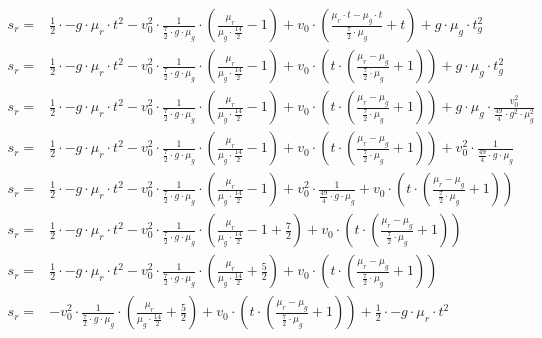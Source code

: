 \begin{equation}
\begin{aligned}
    s_r = & \frac{1}{2} \cdot -g \cdot \mu_r \cdot t^2 - v_0^2 \cdot \frac{1}{\frac{7}{2} \cdot g \cdot \mu_g} \cdot (\frac{\mu_r}{\mu_g \cdot \frac{14}{2}} - 1) + v_0 \cdot (\frac{\mu_r \cdot t - \mu_g \cdot t}{\frac{7}{2} \cdot \mu_g} + t) + g \cdot \mu_g \cdot t_g^2\\
    s_r = & \frac{1}{2} \cdot -g \cdot \mu_r \cdot t^2 - v_0^2 \cdot \frac{1}{\frac{7}{2} \cdot g \cdot \mu_g} \cdot (\frac{\mu_r}{\mu_g \cdot \frac{14}{2}} - 1) + v_0 \cdot (t \cdot (\frac{\mu_r - \mu_g}{\frac{7}{2} \cdot \mu_g} + 1)) + g \cdot \mu_g \cdot t_g^2\\
    s_r = & \frac{1}{2} \cdot -g \cdot \mu_r \cdot t^2 - v_0^2 \cdot \frac{1}{\frac{7}{2} \cdot g \cdot \mu_g} \cdot (\frac{\mu_r}{\mu_g \cdot \frac{14}{2}} - 1) + v_0 \cdot (t \cdot (\frac{\mu_r - \mu_g}{\frac{7}{2} \cdot \mu_g} + 1)) + g \cdot \mu_g \cdot \frac{v_0^2}{\frac{49}{4} \cdot g^2 \cdot \mu_g^2}\\
    s_r = & \frac{1}{2} \cdot -g \cdot \mu_r \cdot t^2 - v_0^2 \cdot \frac{1}{\frac{7}{2} \cdot g \cdot \mu_g} \cdot (\frac{\mu_r}{\mu_g \cdot \frac{14}{2}} - 1) + v_0 \cdot (t \cdot (\frac{\mu_r - \mu_g}{\frac{7}{2} \cdot \mu_g} + 1)) + v_0^2 \cdot \frac{1}{\frac{49}{4} \cdot g \cdot \mu_g}\\
    s_r = & \frac{1}{2} \cdot -g \cdot \mu_r \cdot t^2 - v_0^2 \cdot \frac{1}{\frac{7}{2} \cdot g \cdot \mu_g} \cdot (\frac{\mu_r}{\mu_g \cdot \frac{14}{2}} - 1) + v_0^2 \cdot \frac{1}{\frac{49}{4} \cdot g \cdot \mu_g} + v_0 \cdot (t \cdot (\frac{\mu_r - \mu_g}{\frac{7}{2} \cdot \mu_g} + 1))\\
    s_r = & \frac{1}{2} \cdot -g \cdot \mu_r \cdot t^2 - v_0^2 \cdot \frac{1}{\frac{7}{2} \cdot g \cdot \mu_g} \cdot (\frac{\mu_r}{\mu_g \cdot \frac{14}{2}} - 1 + \frac{7}{2}) + v_0 \cdot (t \cdot (\frac{\mu_r - \mu_g}{\frac{7}{2} \cdot \mu_g} + 1))\\
    s_r = & \frac{1}{2} \cdot -g \cdot \mu_r \cdot t^2 - v_0^2 \cdot \frac{1}{\frac{7}{2} \cdot g \cdot \mu_g} \cdot (\frac{\mu_r}{\mu_g \cdot \frac{14}{2}} + \frac{5}{2}) + v_0 \cdot (t \cdot (\frac{\mu_r - \mu_g}{\frac{7}{2} \cdot \mu_g} + 1))\\
    s_r = & -v_0^2 \cdot \frac{1}{\frac{7}{2} \cdot g \cdot \mu_g} \cdot (\frac{\mu_r}{\mu_g \cdot \frac{14}{2}} + \frac{5}{2}) + v_0 \cdot (t \cdot (\frac{\mu_r - \mu_g}{\frac{7}{2} \cdot \mu_g} + 1)) + \frac{1}{2} \cdot -g \cdot \mu_r \cdot t^2\\
\end{aligned}
\end{equation}

